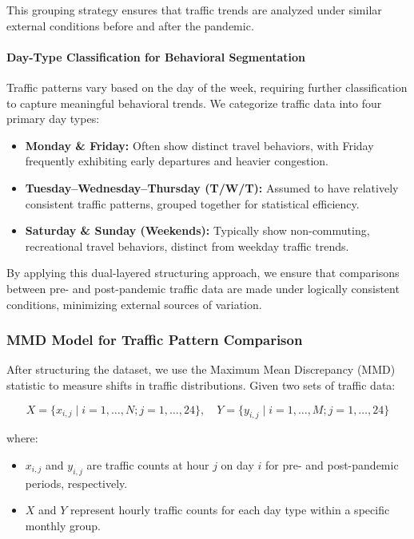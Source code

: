\documentclass{article}
\begin{document}
This grouping strategy ensures that traffic trends are analyzed under similar external conditions before and after the pandemic.

\paragraph{Day-Type Classification for Behavioral Segmentation}

Traffic patterns vary based on the day of the week, requiring further classification to capture meaningful behavioral trends. We categorize traffic data into four primary day types:

\begin{itemize}
    \item \textbf{Monday \& Friday:} Often show distinct travel behaviors, with Friday frequently exhibiting early departures and heavier congestion.
    \item \textbf{Tuesday–Wednesday–Thursday (T/W/T):} Assumed to have relatively consistent traffic patterns, grouped together for statistical efficiency.
    \item \textbf{Saturday \& Sunday (Weekends):} Typically show non-commuting, recreational travel behaviors, distinct from weekday traffic trends.
\end{itemize}

By applying this dual-layered structuring approach, we ensure that comparisons between pre- and post-pandemic traffic data are made under logically consistent conditions, minimizing external sources of variation.

\subsubsection{MMD Model for Traffic Pattern Comparison}

After structuring the dataset, we use the Maximum Mean Discrepancy (MMD) statistic to measure shifts in traffic distributions. Given two sets of traffic data:

\[
X = \{x_{i,j} \mid i = 1, \dots, N; j = 1, \dots, 24\}, \quad Y = \{y_{i,j} \mid i = 1, \dots, M; j = 1, \dots, 24\}
\]

where:

\begin{itemize}
    \item $x_{i,j}$ and $y_{i,j}$ are traffic counts at hour $j$ on day $i$ for pre- and post-pandemic periods, respectively.
    \item $X$ and $Y$ represent hourly traffic counts for each day type within a specific monthly group.
\end{itemize}
\end{document}
